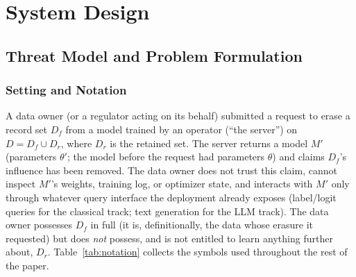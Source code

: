 \documentclass[10pt,journal,compsoc]{IEEEtran}
\begin{document}
\section{System Design}
\label{sec:system-design}

\subsection{Threat Model and Problem Formulation}
\label{sec:threat}

\subsubsection{Setting and Notation}

A data owner (or a regulator acting on its behalf) submitted a request to erase a record set $D_f$ from a model trained by an operator (``the server'') on $D = D_f \cup D_r$, where $D_r$ is the retained set. The server returns a model $M'$ (parameters $\theta'$; the model before the request had parameters $\theta$) and claims $D_f$'s influence has been removed. The data owner does not trust this claim, cannot inspect $M'$'s weights, training log, or optimizer state, and interacts with $M'$ only through whatever query interface the deployment already exposes (label/logit queries for the classical track; text generation for the LLM track). The data owner possesses $D_f$ in full (it is, definitionally, the data whose erasure it requested) but does \emph{not} possess, and is not entitled to learn anything further about, $D_r$. Table~\ref{tab:notation} collects the symbols used throughout the rest of the paper.
\end{document}
